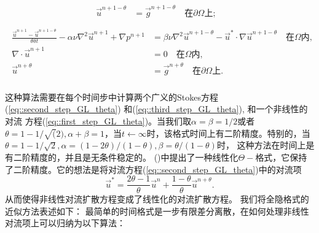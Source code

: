 \begin{algorithm}
\begin{algorithmic}[1]
\begin{eqnarray}
\begin{aligned}
                        \vec{u}^{n + 1 - \theta} & = \vec{g}^{n + 1 - \theta} \quad \mbox{在} \partial \Omega \mbox{上};& \\
                    \end{aligned}
                    \label{eq::second_step_GL_theta}
                \end{eqnarray}
                \begin{eqnarray}
                    \begin{aligned}
                        \frac{\vec{u}^{n + 1} - \vec{u}^{n + 1 - \theta}}{\theta \delta t} - \alpha \nu \nabla^2\vec{u}^{n + 1} +
                        \nabla p^{n + 1}
                        & = \beta \nu \nabla^2\vec{u}^{n + 1 - \theta} - \vec{u}^* \cdot \nabla\vec{u}^{n + 1 - \theta} \quad \mbox {在} \Omega \mbox{内},& \\
                        \nabla \cdot \vec{u}^{n + 1} & = 0 \quad \mbox{在} \Omega \mbox{内},&\\
                        \vec{u}^{n + \theta} & = \vec{g}^{n + \theta} \quad \mbox{在} \partial \Omega \mbox{上}.& \\
                    \end{aligned}
                    \label{eq::third_step_GL_theta}
                \end{eqnarray}
            \end{algorithmic}
         \end{algorithm}
         这种算法需要在每个时间步中计算两个广义的Stokes方程(\ref{eq::second_step_GL_theta}) 和(\ref{eq::third_step_GL_theta}), 和一个非线性的对流
         方程(\ref{eq::first_step_GL_theta})。当我们取$\alpha = \beta = 1/2$或者$\theta = 1 - 1/\sqrt(2), \alpha + \beta = 1$，当$t \leftarrow
         \infty$时，该格式时间上有二阶精度。特别的，当$\theta = 1 - 1/\sqrt{2}, \alpha = (1 -2\theta)/(1 - \theta), \beta = \theta/(1 - \theta)$时，
         这种方法在时间上是有二阶精度的，并且是无条件稳定的。
         (\cite{smith1997implicit})中提出了一种线性化$\Theta-$格式，它保持了二阶精度。它的想法是将对流方程(\ref{eq::second_step_GL_theta})中的对流项
         \begin{equation}
            \vec{u}^* = \frac{2\theta - 1}{\theta} \vec{u}^n + \frac{1- \theta}{\theta}\vec{u}^{n + \theta}.
         \end{equation}
         从而使得非线性对流扩散方程变成了线性化的对流扩散方程。
         我们将全隐格式的近似方法表述如下：
         最简单的时间格式是一步有限差分离散，在如何处理非线性对流项上可以归纳为以下算法：
